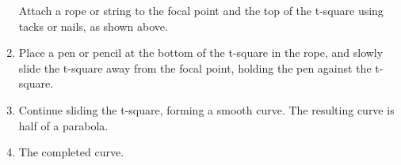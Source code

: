 \documentclass[titlepage]{article}
\begin{document}
\begin{enumerate}
\begin{minipage}[t]{\linewidth}
                \medskip
                Attach a rope or string to the focal point and the top of the t-square using tacks or nails, as shown above.
            \end{minipage}
            \item \begin{minipage}[t]{\linewidth}
                \raggedright

                \medskip
                Place a pen or pencil at the bottom of the t-square in the rope, and slowly slide the t-square away from the focal point, 
                holding the pen against the t-square.  
                \end{minipage}
            \item \begin{minipage}[t]{\linewidth}
                \raggedright

                \medskip
                Continue sliding the t-square, forming a smooth curve.  The resulting curve is half of a parabola.
            \end{minipage}
            \item \begin{minipage}[t]{\linewidth}
                \raggedright

                \medskip
                The completed curve.
            \end{minipage}
        \end{enumerate}
    \newpage
    \printbibliography
\end{document}
